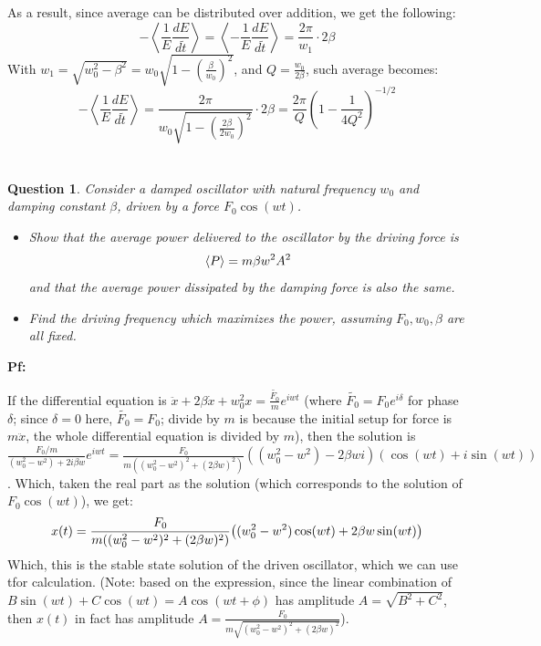 \documentclass{article}
\newtheorem{question}{Question}
\DeclarePairedDelimiter{\paran}{(}{)}%
\DeclarePairedDelimiter{\bracket}{\langle}{\rangle}
\begin{document}
As a result, since average can be distributed over addition, we get the following:
\begin{equation}
    -\left<\frac{1}{E}\frac{dE}{d\tilde{t}}\right>=\left<-\frac{1}{E}\frac{dE}{d\tilde{t}}\right> = \frac{2\pi}{w_1}\cdot 2\beta
\end{equation}
With $w_1 = \sqrt{w_0^2-\beta^2} = w_0\sqrt{1-\left(\frac{\beta}{w_0}\right)^2}$, and $Q=\frac{w_0}{2\beta}$, such average becomes:
\begin{equation}
    -\left<\frac{1}{E}\frac{dE}{d\tilde{t}}\right> = \frac{2\pi}{w_0\sqrt{1-\left(\frac{2\beta}{2w_0}\right)^2}}\cdot 2\beta  = \frac{2\pi}{Q}\left(1-\frac{1}{4Q^2}\right)^{-1/2}
\end{equation}

\break

\section{}
\begin{question}\label{q3}
    Consider a damped oscillator with natural frequency $w_0$ and damping constant $\beta$, driven by a force $F_0\cos(wt)$.
    \begin{itemize}
        \item[(a)] Show that the average power delivered to the oscillator by the driving force is 
        $$\bracket*{P}=m\beta w^2A^2$$
        and that the average power dissipated by the damping force is also the same.
        \item[(b)] Find the driving frequency which maximizes the power, assuming $F_0, w_0, \beta$ are all fixed.
    \end{itemize}
\end{question}

\textbf{Pf:}

If the differential equation is $\ddot x+2\beta \dot x + w_0^2x = \frac{\tilde{F_0}}{m}e^{iwt}$ (where $\tilde{F_0}=F_0e^{i\delta}$ for phase $\delta$; since $\delta=0$ here, $\tilde{F_0}=F_0$; divide by $m$ is because the initial setup for force is $m\ddot x$, the whole differential equation is divided by $m$), then the solution is $\frac{F_0/m}{(w_0^2-w^2)+2i\beta w}e^{iwt} = \frac{F_0}{m((w_0^2-w^2)^2+(2\beta w)^2)}((w_0^2-w^2)-2\beta wi)(\cos(wt)+i\sin(wt))$. Which, taken the real part as the solution (which corresponds to the solution of $F_0\cos(wt)$), we get:
\begin{equation}
    x(t) = \frac{F_0}{m((w_0^2-w^2)^2+(2\beta w)^2)}\paran*{(w_0^2-w^2)\cos(wt)+2\beta w\sin(wt)}
\end{equation}
Which, this is the stable state solution of the driven oscillator, which we can use tfor calculation. (Note: based on the expression, since the linear combination of $B\sin(wt)+C\cos(wt)=A\cos(wt+\phi)$ has amplitude $A=\sqrt{B^2+C^2}$, then $x(t)$ in fact has amplitude $A=\frac{F_0}{m\sqrt{(w_0^2-w^2)^2+(2\beta w)^2}}$).
\end{document}
